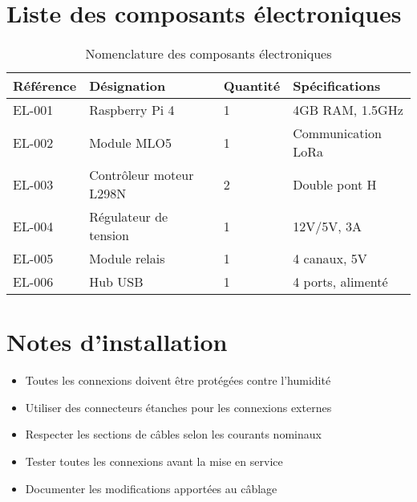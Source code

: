 \section{Liste des composants électroniques}
\begin{table}[!htbp]
    \centering
    \caption{Nomenclature des composants électroniques}
    \label{tab:electronic-components}
    \begin{tabular}{llll}
        \toprule
        \textbf{Référence} & \textbf{Désignation} & \textbf{Quantité} & \textbf{Spécifications} \\
        \midrule
        EL-001 & Raspberry Pi 4 & 1 & 4GB RAM, 1.5GHz \\
        EL-002 & Module MLO5 & 1 & Communication LoRa \\
        EL-003 & Contrôleur moteur L298N & 2 & Double pont H \\
        EL-004 & Régulateur de tension & 1 & 12V/5V, 3A \\
        EL-005 & Module relais & 1 & 4 canaux, 5V \\
        EL-006 & Hub USB & 1 & 4 ports, alimenté \\
        \bottomrule
    \end{tabular}
\end{table}

\section{Notes d'installation}
\begin{itemize}
    \item Toutes les connexions doivent être protégées contre l'humidité
    \item Utiliser des connecteurs étanches pour les connexions externes
    \item Respecter les sections de câbles selon les courants nominaux
    \item Tester toutes les connexions avant la mise en service
    \item Documenter les modifications apportées au câblage
\end{itemize} 